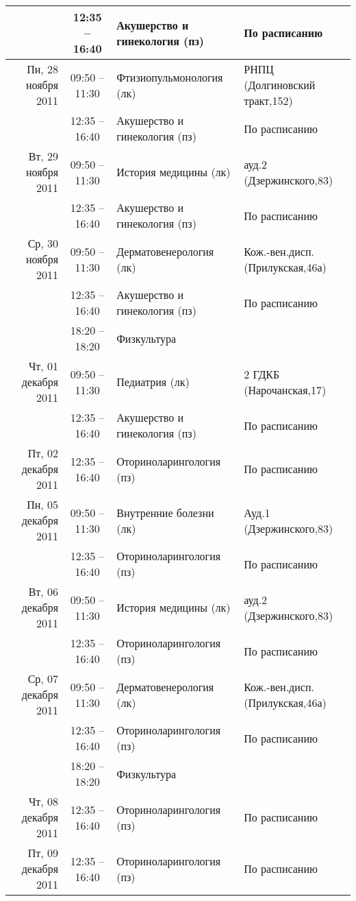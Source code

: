 \documentclass[a4paper,10pt,notitlepage]{report}
\begin{document}
\begin{center}
{\begin{longtable}{r|c|l|l|}
  & 12:35 -- 16:40 & Акушерство и гинекология (пз) & По расписанию \\ \cline{2-4}
\hline Пн, 28 ноября 2011
  & 09:50 -- 11:30 & Фтизиопульмонология (лк) & РНПЦ (Долгиновский тракт,152) \\ \cline{2-4}
  & 12:35 -- 16:40 & Акушерство и гинекология (пз) & По расписанию \\ \cline{2-4}
\hline Вт, 29 ноября 2011
  & 09:50 -- 11:30 & История медицины (лк) & ауд.2 (Дзержинского,83) \\ \cline{2-4}
  & 12:35 -- 16:40 & Акушерство и гинекология (пз) & По расписанию \\ \cline{2-4}
\hline Ср, 30 ноября 2011
  & 09:50 -- 11:30 & Дерматовенерология (лк) & Кож.-вен.дисп.(Прилукская,46а) \\ \cline{2-4}
  & 12:35 -- 16:40 & Акушерство и гинекология (пз) & По расписанию \\ \cline{2-4}
  & 18:20 -- 18:20 & Физкультура  &  \\ \cline{2-4}
\hline Чт, 01 декабря 2011
  & 09:50 -- 11:30 & Педиатрия (лк) & 2 ГДКБ (Нарочанская,17) \\ \cline{2-4}
  & 12:35 -- 16:40 & Акушерство и гинекология (пз) & По расписанию \\ \cline{2-4}
\hline Пт, 02 декабря 2011
  & 12:35 -- 16:40 & Оториноларингология (пз) & По расписанию \\ \cline{2-4}
\hline Пн, 05 декабря 2011
  & 09:50 -- 11:30 & Внутренние болезни (лк) & Ауд.1 (Дзержинского,83) \\ \cline{2-4}
  & 12:35 -- 16:40 & Оториноларингология (пз) & По расписанию \\ \cline{2-4}
\hline Вт, 06 декабря 2011
  & 09:50 -- 11:30 & История медицины (лк) & ауд.2 (Дзержинского,83) \\ \cline{2-4}
  & 12:35 -- 16:40 & Оториноларингология (пз) & По расписанию \\ \cline{2-4}
\hline Ср, 07 декабря 2011
  & 09:50 -- 11:30 & Дерматовенерология (лк) & Кож.-вен.дисп.(Прилукская,46а) \\ \cline{2-4}
  & 12:35 -- 16:40 & Оториноларингология (пз) & По расписанию \\ \cline{2-4}
  & 18:20 -- 18:20 & Физкультура  &  \\ \cline{2-4}
\hline Чт, 08 декабря 2011
  & 12:35 -- 16:40 & Оториноларингология (пз) & По расписанию \\ \cline{2-4}
\hline Пт, 09 декабря 2011
  & 12:35 -- 16:40 & Оториноларингология (пз) & По расписанию \\ \cline{2-4}

\end{longtable}}
\end{center}
\end{document}
